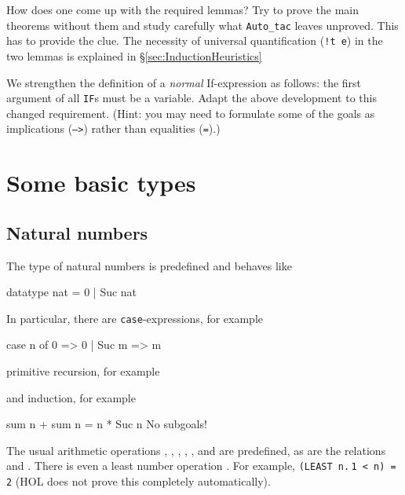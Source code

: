 How does one come up with the required lemmas? Try to prove the main theorems
without them and study carefully what \texttt{Auto_tac} leaves unproved. This
has to provide the clue.
The necessity of universal quantification (\texttt{!t e}) in the two lemmas
is explained in \S\ref{sec:InductionHeuristics}

\begin{exercise}
  We strengthen the definition of a {\em normal\/} If-expression as follows:
  the first argument of all \texttt{IF}s must be a variable. Adapt the above
  development to this changed requirement. (Hint: you may need to formulate
  some of the goals as implications (\texttt{-->}) rather than equalities
  (\texttt{=}).)
\end{exercise}

\section{Some basic types}


\subsection{Natural numbers}

The type  of natural numbers is predefined and behaves like
\begin{ttbox}
datatype nat = 0 | Suc nat
\end{ttbox}
In particular, there are \texttt{case}-expressions, for example
\begin{ttbox}
case n of 0 => 0 | Suc m => m
\end{ttbox}
primitive recursion, for example
\begin{ttbox}
\end{ttbox}
and induction, for example
\begin{ttbox}
\ttbreak
{\out sum n + sum n = n * Suc n}
{\out No subgoals!}
\end{ttbox}

The usual arithmetic operations \ttindexbold{+}, \ttindexbold{-},
\ttindexbold{*}, , ,  and
 are predefined, as are the relations \ttindexbold{<=} and
\ttindexbold{<}. There is even a least number operation .
For example, \texttt{(LEAST n.$\,$1 < n) = 2} (HOL does not prove this
completely automatically).

